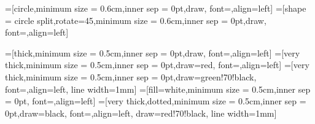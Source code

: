 
=[circle,minimum size = 0.6cm,inner sep = 0pt,draw, font=\small,align=left]
=[shape = circle split,rotate=45,minimum size = 0.6cm,inner sep = 0pt,draw, font=\small,align=left]

=[thick,minimum size = 0.5cm,inner sep = 0pt,draw, font=\small,align=left]
=[very thick,minimum size = 0.5cm,inner sep = 0pt,draw=red, font=\small,align=left]
=[very thick,minimum size = 0.5cm,inner sep = 0pt,draw=green!70!black, font=\small,align=left, line width=1mm]
=[fill=white,minimum size = 0.5cm,inner sep = 0pt, font=\tiny,align=left]
=[very thick,dotted,minimum size = 0.5cm,inner sep = 0pt,draw=black, font=\small,align=left, draw=red!70!black, line width=1mm]


